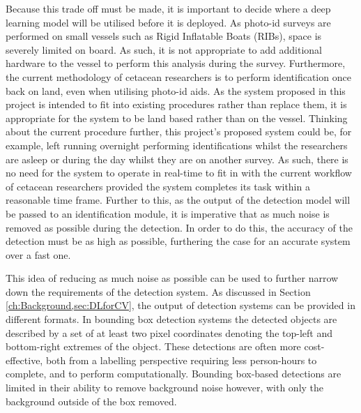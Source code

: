  Because this trade off must be made, it is important to decide where a deep learning model will be utilised before it is deployed. As photo-id surveys are performed on small vessels such as Rigid Inflatable Boats (RIBs), space is severely limited on board. As such, it is not appropriate to add additional hardware to the vessel to perform this analysis during the survey. Furthermore, the current methodology of cetacean researchers is to perform identification once back on land, even when utilising photo-id aids. As the system proposed in this project is intended to fit into existing procedures rather than replace them, it is appropriate for the system to be land based rather than on the vessel. Thinking about the current procedure further, this project's proposed system could be, for example, left running overnight performing identifications whilst the researchers are asleep or during the day whilst they are on another survey. As such, there is no need for the system to operate in real-time to fit in with the current workflow of cetacean researchers provided the system completes its task within a reasonable time frame. Further to this, as the output of the detection model will be passed to an identification module, it is imperative that as much noise is removed as possible during the detection. In order to do this, the accuracy of the detection must be as high as possible, furthering the case for an accurate system over a fast one.
 
 This idea of reducing as much noise as possible can be used to further narrow down the requirements of the detection system. As discussed in Section \ref{ch:Background,sec:DLforCV}, the output of detection systems can be provided in different formats. In bounding box detection systems the detected objects are described by a set of at least two pixel coordinates denoting the top-left and bottom-right extremes of the object. These detections are often more cost-effective, both from a labelling perspective requiring less person-hours to complete, and to perform computationally. Bounding box-based detections are limited in their ability to remove background noise however, with only the background outside of the box removed.
 
